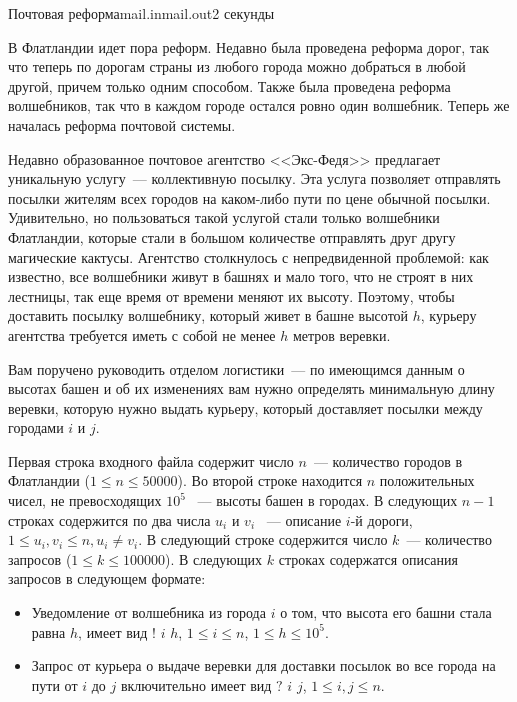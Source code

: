 \begin{problem}{Почтовая реформа}{mail.in}{mail.out}{2 секунды}


В Флатландии идет пора реформ. Недавно была проведена реформа дорог, так что теперь
по дорогам страны из любого города можно добраться в любой другой, причем только одним способом. 
Также была проведена реформа волшебников, так что в каждом городе остался ровно один волшебник.
Теперь же началась реформа почтовой системы.

Недавно образованное почтовое агентство <<Экс-Федя>> предлагает уникальную услугу~---
коллективную посылку. Эта услуга позволяет отправлять посылки жителям всех городов
на каком-либо пути по цене обычной посылки. Удивительно, но пользоваться такой 
услугой стали только волшебники Флатландии, которые стали в большом количестве 
отправлять друг другу магические кактусы.
Агентство столкнулось с непредвиденной проблемой: как известно, все волшебники живут 
в башнях и мало того, что не строят в них лестницы, так еще время от времени меняют 
их высоту. Поэтому, чтобы доставить посылку волшебнику, который живет в 
башне высотой $h$, курьеру агентства требуется иметь с собой не менее $h$ метров веревки.

Вам поручено руководить отделом логистики~--- по имеющимся данным о высотах башен 
и об их изменениях вам нужно определять минимальную длину веревки, которую нужно 
выдать курьеру, который доставляет посылки между городами $i$ и $j$.

\InputFile

Первая строка входного файла содержит число $n$~--- количество городов в Флатландии ($1 \le n \le 50000$).
Во второй строке находится $n$ положительных чисел, не превосходящих $10^5$~ --- высоты башен в городах.
В следующих $n-1$ строках содержится по два числа $u_i$ и $v_i$ ~--- описание $i$-й 
дороги, $1 \le u_i, v_i \le n, u_i \ne v_i$. В следующий строке содержится число $k$~--- количество 
запросов ($1 \le k \le 100000$). В следующих $k$ строках содержатся описания запросов в следующем формате:
\begin{itemize}

\item Уведомление от волшебника из города $i$ о том, что высота его башни стала равна $h$,
имеет вид $!$ $i$ $h$, 
$1 \le i \le n$, $1 \le h \le 10^5$.
\item Запрос от курьера о выдаче веревки для доставки посылок во все города на пути
от $i$ до $j$ включительно имеет вид $?$ $i$ $j$, $1 \le i, j \le n$.


\end{itemize}
\end{problem}
